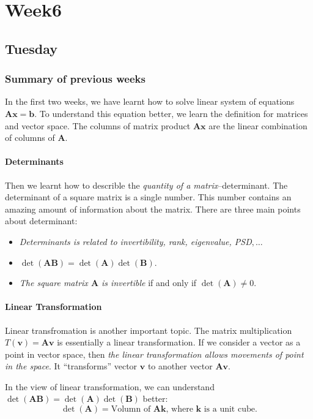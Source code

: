 
\chapter{Week6}

\section{Tuesday}
\subsection{Summary of previous weeks}
In the first two weeks, we have learnt how to solve linear system of equations $\bm{Ax}=\bm b$. To understand this equation better, we learn the definition for matrices and vector space. The columns of matrix product $\bm{Ax}$ are the linear combination of columns of $\bm{A}$.
\subsubsection{Determinants}
Then we learnt how to describle the \emph{quantity of a matrix}--determinant. The determinant of a square matrix is a single number. This number contains an amazing amount of information about the matrix. There are three main points about determinant:
\begin{itemize}
\item
\textit{Determinants is related to invertibility, rank, eigenvalue, PSD$,\dots$}
\item
$\det(\bm{AB})=\det(\bm A)\det(\bm B).$
\item
\textit{The square matrix $\bm A$ is invertible} if and only if $\det(\bm A)\ne 0.$
\end{itemize}

\subsubsection{Linear Transformation}

Linear transfromation is another important topic. The matrix multiplication $T(\bm v)=\bm{Av}$ is essentially a linear transformation. If we consider a vector as a point in vector space, then \textit{the linear transformation allows movements of point in the space}. It ``transforms'' vector $\bm v$ to another vector $\bm{Av}$.

In the view of linear transformation, we can understand $\det(\bm{AB})=\det(\bm A)\det(\bm B)$ better:
\[
\det(\bm A)=\text{Volumn of $\bm{Ak}$, where $\bm k$ is a unit cube.}
\]

